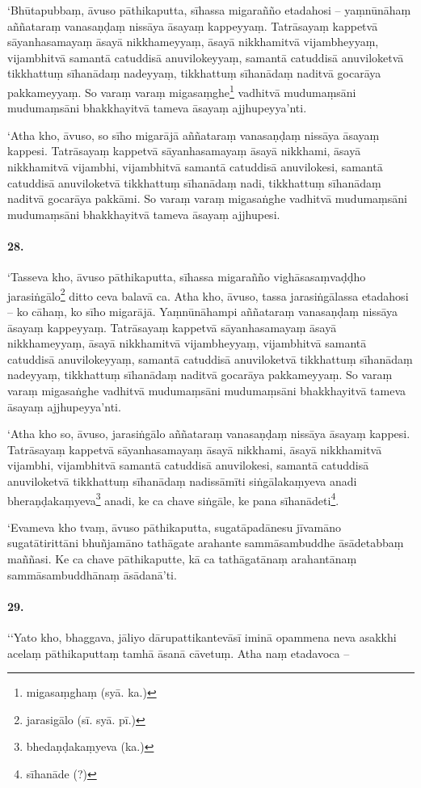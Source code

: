 ‘Bhūtapubbaṃ, āvuso pāthikaputta, sīhassa migarañño etadahosi – yaṃnūnāhaṃ aññataraṃ vanasaṇḍaṃ nissāya āsayaṃ kappeyyaṃ. Tatrāsayaṃ kappetvā sāyanhasamayaṃ āsayā nikkhameyyaṃ, āsayā nikkhamitvā vijambheyyaṃ, vijambhitvā samantā catuddisā anuvilokeyyaṃ, samantā catuddisā anuviloketvā tikkhattuṃ sīhanādaṃ nadeyyaṃ, tikkhattuṃ sīhanādaṃ naditvā gocarāya pakkameyyaṃ. So varaṃ varaṃ migasaṃghe\footnote{migasaṃghaṃ (syā. ka.)} vadhitvā mudumaṃsāni mudumaṃsāni bhakkhayitvā tameva āsayaṃ ajjhupeyya’nti.

‘Atha kho, āvuso, so sīho migarājā aññataraṃ vanasaṇḍaṃ nissāya āsayaṃ kappesi. Tatrāsayaṃ kappetvā sāyanhasamayaṃ āsayā nikkhami, āsayā nikkhamitvā vijambhi, vijambhitvā samantā catuddisā anuvilokesi, samantā catuddisā anuviloketvā tikkhattuṃ sīhanādaṃ nadi, tikkhattuṃ sīhanādaṃ naditvā gocarāya pakkāmi. So varaṃ varaṃ migasaṅghe vadhitvā mudumaṃsāni mudumaṃsāni bhakkhayitvā tameva āsayaṃ ajjhupesi.

\paragraph{28.} ‘Tasseva kho, āvuso pāthikaputta, sīhassa migarañño vighāsasaṃvaḍḍho jarasiṅgālo\footnote{jarasigālo (sī. syā. pī.)} ditto ceva balavā ca. Atha kho, āvuso, tassa jarasiṅgālassa etadahosi – ko cāhaṃ, ko sīho migarājā. Yaṃnūnāhampi aññataraṃ vanasaṇḍaṃ nissāya āsayaṃ kappeyyaṃ. Tatrāsayaṃ kappetvā sāyanhasamayaṃ āsayā nikkhameyyaṃ, āsayā nikkhamitvā vijambheyyaṃ, vijambhitvā samantā catuddisā anuvilokeyyaṃ, samantā catuddisā anuviloketvā tikkhattuṃ sīhanādaṃ nadeyyaṃ, tikkhattuṃ sīhanādaṃ naditvā gocarāya pakkameyyaṃ. So varaṃ varaṃ migasaṅghe vadhitvā mudumaṃsāni mudumaṃsāni bhakkhayitvā tameva āsayaṃ ajjhupeyya’nti.

‘Atha kho so, āvuso, jarasiṅgālo aññataraṃ vanasaṇḍaṃ nissāya āsayaṃ kappesi. Tatrāsayaṃ kappetvā sāyanhasamayaṃ āsayā nikkhami, āsayā nikkhamitvā vijambhi, vijambhitvā samantā catuddisā anuvilokesi, samantā catuddisā anuviloketvā tikkhattuṃ sīhanādaṃ nadissāmīti siṅgālakaṃyeva anadi bheraṇḍakaṃyeva\footnote{bhedaṇḍakaṃyeva (ka.)} anadi, ke ca chave siṅgāle, ke pana sīhanādeti\footnote{sīhanāde (?)}.

‘Evameva kho tvaṃ, āvuso pāthikaputta, sugatāpadānesu jīvamāno sugatātirittāni bhuñjamāno tathāgate arahante sammāsambuddhe āsādetabbaṃ maññasi. Ke ca chave pāthikaputte, kā ca tathāgatānaṃ arahantānaṃ sammāsambuddhānaṃ āsādanā’ti.

\paragraph{29.} ‘‘Yato kho, bhaggava, jāliyo dārupattikantevāsī iminā opammena neva asakkhi acelaṃ pāthikaputtaṃ tamhā āsanā cāvetuṃ. Atha naṃ etadavoca –

